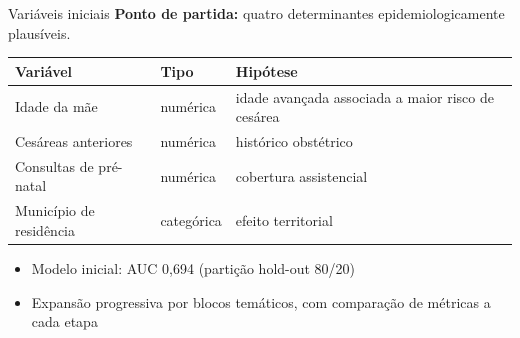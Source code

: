 \documentclass[aspectratio=169,xcolor=table]{beamer}
\begin{document}
\begin{frame}{Variáveis iniciais}
    \textbf{Ponto de partida:} quatro determinantes epidemiologicamente plausíveis.

    \vspace{0.4em}
    \begin{table}
        \centering
        \small
        \begin{tabular}{lll}
            \toprule
            Variável & Tipo & Hipótese \\
            \midrule
            Idade da mãe & numérica & idade avançada associada a maior risco de cesárea \\
            Cesáreas anteriores & numérica & histórico obstétrico \\
            Consultas de pré-natal & numérica & cobertura assistencial \\
            Município de residência & categórica & efeito territorial \\
            \bottomrule
        \end{tabular}
    \end{table}

    \vspace{0.3em}
    \begin{itemize}
        \item Modelo inicial: AUC 0{,}694 (partição hold-out 80/20)
        \item Expansão progressiva por blocos temáticos, com comparação de métricas a cada etapa
    \end{itemize}
\end{frame}
\end{document}

